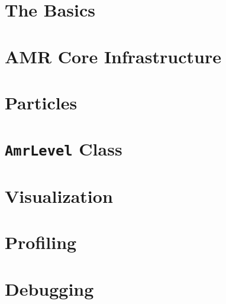 \documentclass[11pt]{book}
\makeatletter
\renewcommand*\cleardoublepage{\clearpage\if@twoside
\ifodd\c@page\else
\hbox{}
\thispagestyle{empty}
\newpage
\if@twocolumn\hbox{}\newpage\fi\fi\fi}
\makeatother
\begin{document}
\chapter{The Basics}\label{Chap:Basics}


\chapter{AMR Core Infrastructure}\label{Chap:AmrCore}


\chapter{Particles}\label{Chap:Particles}


\chapter{{\tt AmrLevel} Class}\label{Chap:AmrLevel}


\chapter{Visualization}\label{Chap:Visualization}


\chapter{Profiling}\label{Chap:Profiling}


\chapter{Debugging}\label{Chap:Debugging}


\backmatter

% 
% 

\cleardoublepage
{}
{}
\printindex
\end{document}
